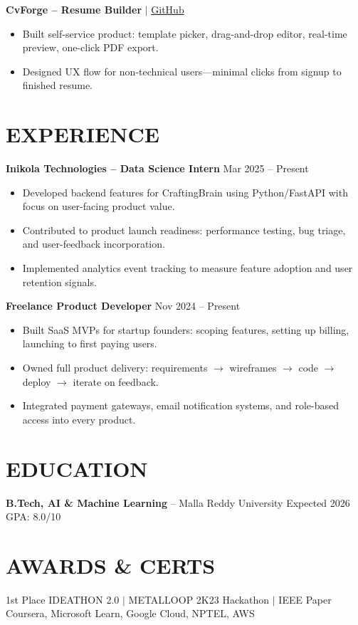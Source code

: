 \documentclass[10pt]{article}
\begin{document}
\textbf{CvForge -- Resume Builder} $|$ \href{https://github.com/JeetInTech/CvForge-Online}{GitHub}
\begin{itemize}
\item Built self-service product: template picker, drag-and-drop editor, real-time preview, one-click PDF export.
\item Designed UX flow for non-technical users---minimal clicks from signup to finished resume.
\end{itemize}

\section*{EXPERIENCE}
\textbf{Inikola Technologies -- Data Science Intern} \hfill Mar 2025 -- Present
\begin{itemize}
\item Developed backend features for CraftingBrain using Python/FastAPI with focus on user-facing product value.
\item Contributed to product launch readiness: performance testing, bug triage, and user-feedback incorporation.
\item Implemented analytics event tracking to measure feature adoption and user retention signals.
\end{itemize}

\textbf{Freelance Product Developer} \hfill Nov 2024 -- Present
\begin{itemize}
\item Built SaaS MVPs for startup founders: scoping features, setting up billing, launching to first paying users.
\item Owned full product delivery: requirements $\rightarrow$ wireframes $\rightarrow$ code $\rightarrow$ deploy $\rightarrow$ iterate on feedback.
\item Integrated payment gateways, email notification systems, and role-based access into every product.
\end{itemize}

\section*{EDUCATION}
\textbf{B.Tech, AI \& Machine Learning} -- Malla Reddy University \hfill Expected 2026 \hfill GPA: 8.0/10

\section*{AWARDS \& CERTS}
1st Place IDEATHON 2.0 $|$ METALLOOP 2K23 Hackathon $|$ IEEE Paper \\
Coursera, Microsoft Learn, Google Cloud, NPTEL, AWS
\end{document}

